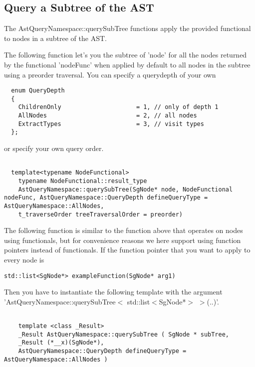 \subsection{Query a Subtree of the AST}

The AstQueryNamespace::querySubTree functions apply the provided functional to nodes in a subtree of the AST.


The following function let's you the subtree of 'node' for all the nodes returned by the functional 'nodeFunc'
when applied by default to all nodes in the subtree using a preorder traversal. You can specify a querydepth of
your own 
\begin{verbatim}
  enum QueryDepth
  {
    ChildrenOnly                     = 1, // only of depth 1
    AllNodes                         = 2, // all nodes
    ExtractTypes                     = 3, // visit types
  };
\end{verbatim}
or specify your own query order.
\begin{verbatim}

  template<typename NodeFunctional>
    typename NodeFunctional::result_type 
    AstQueryNamespace::querySubTree(SgNode* node, NodeFunctional nodeFunc, AstQueryNamespace::QueryDepth defineQueryType = AstQueryNamespace::AllNodes,
	t_traverseOrder treeTraversalOrder = preorder)
\end{verbatim}

The following function is similar to the function above that operates on nodes using functionals, but for convenience
reasons we here support using function pointers instead of functionals. If the function pointer that you want to apply
to every node is
\begin{verbatim}
std::list<SgNode*> exampleFunction(SgNode* arg1) 
\end{verbatim}
Then you have to instantiate the following template with the argument 'AstQueryNamespace::querySubTree$<$ std::list$<$SgNode*$>$ $>$(..)'.
\begin{verbatim}

    template <class _Result> 
    _Result AstQueryNamespace::querySubTree ( SgNode * subTree,
	_Result (*__x)(SgNode*),
	AstQueryNamespace::QueryDepth defineQueryType = AstQueryNamespace::AllNodes )
\end{verbatim}


